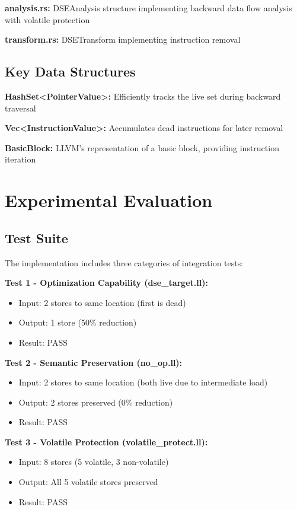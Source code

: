 \documentclass[journal]{IEEEtran}
\begin{document}
\textbf{analysis.rs:} DSEAnalysis structure implementing backward data flow analysis with volatile protection

\textbf{transform.rs:} DSETransform implementing instruction removal

\subsection{Key Data Structures}

\textbf{HashSet<PointerValue>:} Efficiently tracks the live set during backward traversal

\textbf{Vec<InstructionValue>:} Accumulates dead instructions for later removal

\textbf{BasicBlock:} LLVM's representation of a basic block, providing instruction iteration

\section{Experimental Evaluation}

\subsection{Test Suite}

The implementation includes three categories of integration tests:

\textbf{Test 1 - Optimization Capability (dse\_target.ll):}
\begin{itemize}
\item Input: 2 stores to same location (first is dead)
\item Output: 1 store (50\% reduction)
\item Result: PASS
\end{itemize}

\textbf{Test 2 - Semantic Preservation (no\_op.ll):}
\begin{itemize}
\item Input: 2 stores to same location (both live due to intermediate load)
\item Output: 2 stores preserved (0\% reduction)
\item Result: PASS
\end{itemize}

\textbf{Test 3 - Volatile Protection (volatile\_protect.ll):}
\begin{itemize}
\item Input: 8 stores (5 volatile, 3 non-volatile)
\item Output: All 5 volatile stores preserved
\item Result: PASS
\end{itemize}
\end{document}
